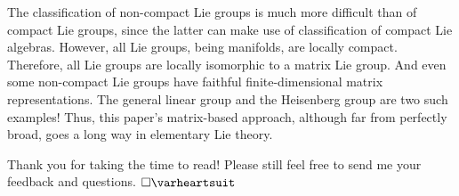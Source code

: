 \documentclass[12pt]{article}
\newcommand{\heart}{\ensuremath\varheartsuit}
\theoremstyle{definition}
\theoremstyle{definition}
\theoremstyle{definition}
\theoremstyle{definition}
\theoremstyle{definition}
\theoremstyle{definition}
\theoremstyle{definition}
\theoremstyle{definition}
\begin{document}
\vspace{6pt}
\par{The classification of non-compact Lie groups
is much more difficult than of compact Lie groups,
since the latter can make use of classification of
compact Lie algebras. However, all Lie groups,
being manifolds, are locally compact. Therefore,
all Lie groups are locally isomorphic to a matrix
Lie group. And even some non-compact Lie groups
have faithful finite-dimensional matrix
representations. The general linear group and the
Heisenberg group are two such examples! Thus, this
paper’s matrix-based approach, although far from
perfectly broad, goes a long way in elementary Lie
theory.}

\vspace{6pt}
\par{Thank you for taking the time
to read! Please still feel free to send me your
feedback and questions. $\square \heart$}



\end{document}
